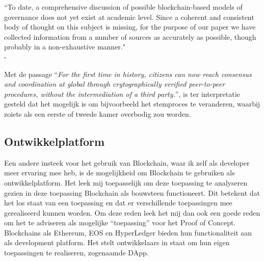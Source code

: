 \begin{formal}
  ``To date, a comprehensive discussion of possible blockchain-based models of governance
  does not yet exist at academic level. Since a coherent and consistent body of thought on this
  subject is missing, for the purpose of our paper we have collected information from a number
  of sources as accurately as possible, though probably in a non-exhaustive manner."
  \\ - \citet[][p.7]{atzori2015blockchain}
\end{formal}

Met de passage ``\textit{For the first time in history, citizens can now reach consensus and coordination at global through crytographically verified peer-to-peer procedures, without the intermediation of a third party.}'', is ter interpretatie gesteld dat het mogelijk is om bijvoorbeeld het stemproces te veranderen, waarbij zoiets als een eerste of tweede kamer overbodig zou worden.

\subsection{Ontwikkelplatform}

Een andere insteek voor het gebruik van Blockchain, waar ik zelf als developer meer ervaring mee heb, is de mogelijkheid om Blockchain te gebruiken als ontwikkelplatform. Het leek mij toepasselijk om deze toepassing te analyseren gezien in deze toepassing Blockchain als bouwsteen functioneert. Dit betekent dat het los staat van een toepassing en dat er verschillende toepassingen mee gerealiseerd kunnen worden. Om deze reden leek het mij dan ook een goede reden om het te adviseren als mogelijke ``toepassing'' voor het Proof of Concept. Blockchains als Ethereum, EOS en HyperLedger bieden hun functionaliteit aan als development platform. Het stelt ontwikkelaars in staat om hun eigen toepassingen te realiseren, zogenaamde \acrfull{DApp}.

